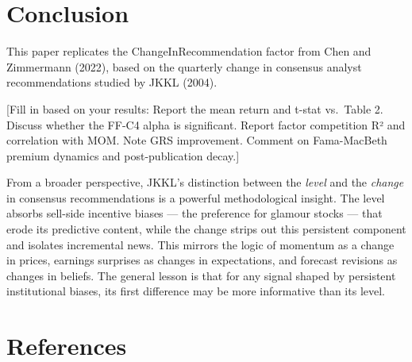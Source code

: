 \documentclass[
  letterpaper,
  DIV=11,
  numbers=noendperiod]{scrartcl}
\begin{document}
\section{Conclusion}\label{conclusion}

This paper replicates the ChangeInRecommendation factor from Chen and
Zimmermann (2022), based on the quarterly change in consensus analyst
recommendations studied by JKKL (2004).

{[}Fill in based on your results: Report the mean return and t-stat
vs.~Table 2. Discuss whether the FF-C4 alpha is significant. Report
factor competition R² and correlation with MOM. Note GRS improvement.
Comment on Fama-MacBeth premium dynamics and post-publication decay.{]}

From a broader perspective, JKKL's distinction between the \emph{level}
and the \emph{change} in consensus recommendations is a powerful
methodological insight. The level absorbs sell-side incentive biases ---
the preference for glamour stocks --- that erode its predictive content,
while the change strips out this persistent component and isolates
incremental news. This mirrors the logic of momentum as a change in
prices, earnings surprises as changes in expectations, and forecast
revisions as changes in beliefs. The general lesson is that for any
signal shaped by persistent institutional biases, its first difference
may be more informative than its level.

\section*{References}\label{references}
\end{document}
